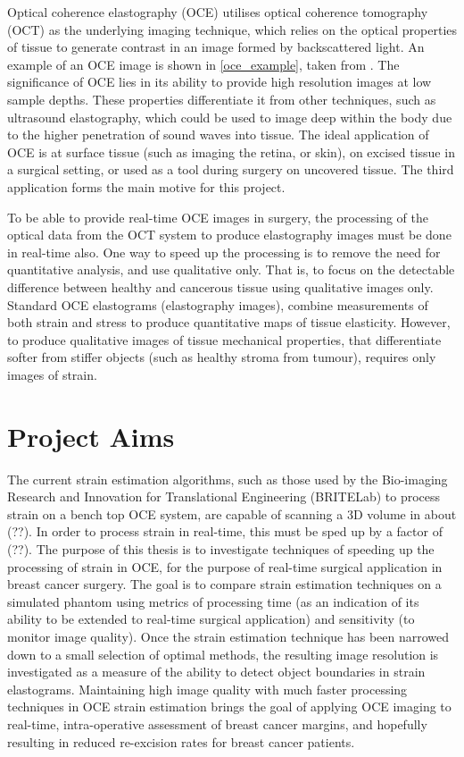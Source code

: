 Optical coherence elastography (OCE) utilises optical coherence tomography (OCT) as the underlying imaging technique, which relies on the optical properties of tissue to generate contrast in an image formed by backscattered light. An example of an OCE image is shown in \autoref{oce_example}, taken from \cite{kennedy_investigation_2015}. The significance of OCE lies in its ability to provide high resolution images at low sample depths. These properties differentiate it from other techniques, such as ultrasound elastography, which could be used to image deep within the body due to the higher penetration of sound waves into tissue. The ideal application of OCE is at surface tissue (such as imaging the retina, or skin), on excised tissue in a surgical setting, or used as a tool during surgery on uncovered tissue. The third application forms the main motive for this project.

To be able to provide real-time OCE images in surgery, the processing of the optical data from the OCT system to produce elastography images must be done in real-time also. One way to speed up the processing is to remove the need for quantitative analysis, and use qualitative only. That is, to focus on the detectable difference between healthy and cancerous tissue using qualitative images only. Standard OCE elastograms (elastography images), combine measurements of both strain and stress to produce quantitative maps of tissue elasticity. However, to produce qualitative images of tissue mechanical properties, that differentiate softer from stiffer objects (such as healthy stroma from tumour), requires only images of strain. 

\section{Project Aims}\label{aims}

The current strain estimation algorithms, such as those used by the Bio-imaging Research and Innovation for Translational Engineering (BRITELab) to process strain on a bench top OCE system, are capable of scanning a 3D volume in about (??). In order to process strain in real-time, this must be sped up by a factor of (??). The purpose of this thesis is to investigate techniques of speeding up the processing of strain in OCE, for the purpose of real-time surgical application in breast cancer surgery. The goal is to compare strain estimation techniques on a simulated phantom using metrics of processing time (as an indication of its ability to be extended to real-time surgical application) and sensitivity (to monitor image quality). Once the strain estimation technique has been narrowed down to a small selection of optimal methods, the resulting image resolution is investigated as a measure of the ability to detect object boundaries in strain elastograms. Maintaining high image quality with much faster processing techniques in OCE strain estimation brings the goal of applying OCE imaging to real-time, intra-operative assessment of breast cancer margins, and hopefully resulting in reduced re-excision rates for breast cancer patients. 


